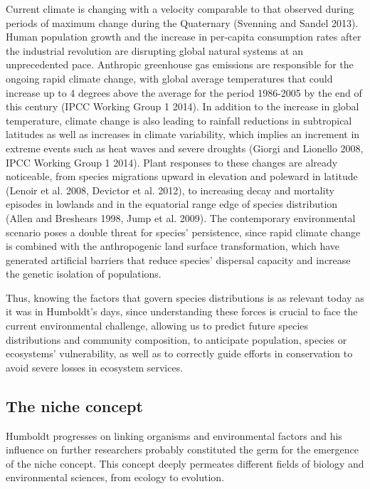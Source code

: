 \documentclass[11pt,twoside]{reedthesis}
\begin{document}
Current climate is changing with a velocity comparable to that observed
during periods of maximum change during the Quaternary (Svenning and
Sandel 2013). Human population growth and the increase in per-capita
consumption rates after the industrial revolution are disrupting global
natural systems at an unprecedented pace. Anthropic greenhouse gas
emissions are responsible for the ongoing rapid climate change, with
global average temperatures that could increase up to 4 degrees above
the average for the period 1986-2005 by the end of this century (IPCC
Working Group 1 2014). In addition to the increase in global
temperature, climate change is also leading to rainfall reductions in
subtropical latitudes as well as increases in climate variability, which
implies an increment in extreme events such as heat waves and severe
droughts (Giorgi and Lionello 2008, IPCC Working Group 1 2014). Plant
responses to these changes are already noticeable, from species
migrations upward in elevation and poleward in latitude (Lenoir et al.
2008, Devictor et al. 2012), to increasing decay and mortality episodes
in lowlands and in the equatorial range edge of species distribution
(Allen and Breshears 1998, Jump et al. 2009). The contemporary
environmental scenario poses a double threat for species' persistence,
since rapid climate change is combined with the anthropogenic land
surface transformation, which have generated artificial barriers that
reduce species' dispersal capacity and increase the genetic isolation of
populations.\par

Thus, knowing the factors that govern species distributions is as
relevant today as it was in Humboldt's days, since understanding these
forces is crucial to face the current environmental challenge, allowing
us to predict future species distributions and community composition, to
anticipate population, species or ecosystems' vulnerability, as well as
to correctly guide efforts in conservation to avoid severe losses in
ecosystem services.\par

\subsection{The niche concept}\label{the-niche-concept}

\par

Humboldt progresses on linking organisms and environmental factors and
his influence on further researchers probably constituted the germ for
the emergence of the niche concept. This concept deeply permeates
different fields of biology and environmental sciences, from ecology to
evolution.\par
\end{document}
